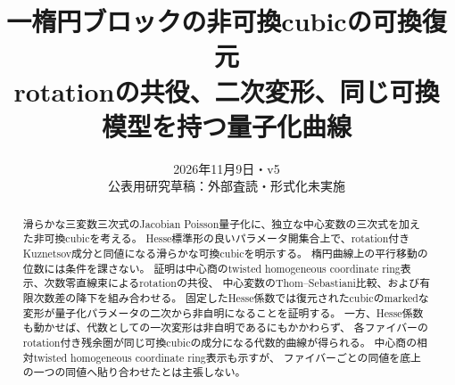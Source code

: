 
\title{一楕円ブロックの非可換cubicの可換復元\\
\large rotationの共役、二次変形、同じ可換模型を持つ量子化曲線}
\author{}
\date{2026年11月9日・v5\\\small 公表用研究草稿：外部査読・形式化未実施}

\maketitle
\begin{abstract}
滑らかな三変数三次式のJacobian Poisson量子化に、独立な中心変数の三次式を加えた非可換cubicを考える。
Hesse標準形の良いパラメータ開集合上で、rotation付きKuznetsov成分と同値になる滑らかな可換cubicを明示する。
楕円曲線上の平行移動の位数には条件を課さない。
証明は中心商のtwisted homogeneous coordinate ring表示、次数零直線束によるrotationの共役、
中心変数のThom--Sebastiani比較、および有限次数差の降下を組み合わせる。
固定したHesse係数では復元されたcubicのmarkedな変形が量子化パラメータの二次から非自明になることを証明する。
一方、Hesse係数も動かせば、代数としての一次変形は非自明であるにもかかわらず、
各ファイバーのrotation付き残余圏が同じ可換cubicの成分になる代数的曲線が得られる。
中心商の相対twisted homogeneous coordinate ring表示も示すが、
ファイバーごとの同値を底上の一つの同値へ貼り合わせたとは主張しない。
\end{abstract}
\tableofcontents


